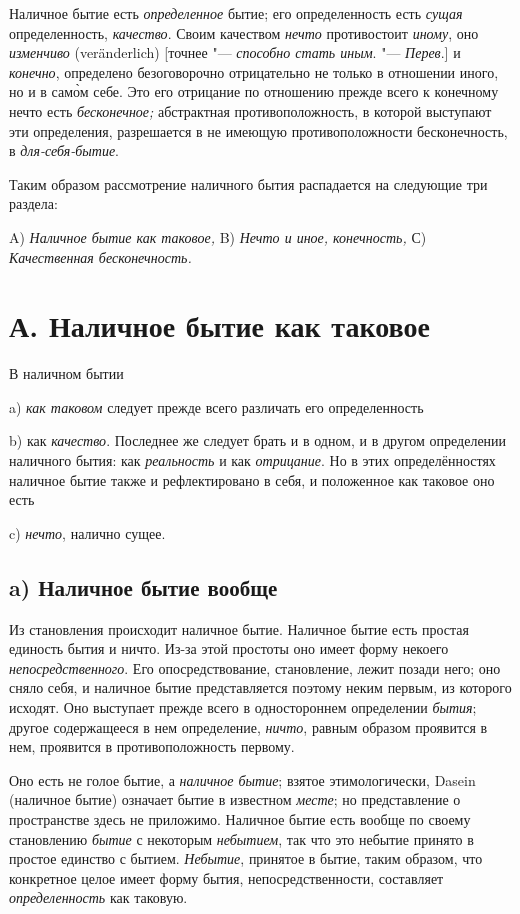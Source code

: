 Наличное бытие есть {\em определенное} бытие; его
определенность есть {\em сущая} определенность,
{\em качество}. Своим качеством
{\em нечто} противостоит
{\em иному}, оно {\em изменчиво}
(veränderlich) [точнее "--- {\em способно стать иным}. "---
{\em Перев}.] и {\em конечно},
определено безоговорочно отрицательно не только в отношении
иного, но и в сам\`{о}м себе. Это его отрицание по отношению прежде всего к
конечному нечто есть {\em бесконечное;} абстрактная
противоположность, в которой выступают эти определения, разрешается в не
имеющую противоположности бесконечность, в
{\em для-себя-бытие}.

Таким образом рассмотрение наличного бытия распадается на следующие три
раздела:

A) {\em Наличное бытие как таковое,}
B) {\em Нечто и иное, конечность,}
С) {\em Качественная бесконечность.}

\section[А. Наличное бытие как таковое]{А. Наличное бытие как таковое}
В наличном бытии

a) {\em как таковом} следует прежде всего различать его
определенность

b) как {\em качество}. Последнее же следует брать и в
одном, и в другом определении наличного бытия: как
{\em реальность} и как
{\em отрицание}. Но в этих определённостях наличное
бытие также и рефлектировано в себя, и положенное как таковое оно есть

c) {\em нечто}, налично сущее.

\subsection[a) Наличное бытие вообще]{a) Наличное бытие вообще}
Из становления происходит наличное бытие. Наличное бытие есть простая
единость бытия и ничто. Из-за этой простоты оно имеет форму некоего
{\em непосредственного}. Его опосредствование,
становление, лежит позади него; оно сняло себя, и наличное бытие
представляется поэтому неким первым, из которого исходят. Оно выступает
прежде всего в одностороннем определении {\em бытия};
другое содержащееся в нем определение, {\em ничто},
равным образом проявится в нем, проявится в противоположность первому.

Оно есть не голое бытие, а {\em наличное бытие}; взятое
этимологически, Dasein (наличное бытие) означает бытие в известном
{\em месте}; но представление о пространстве здесь не
приложимо. Наличное бытие есть вообще по своему становлению
{\em бытие} с некоторым
{\em небытием}, так что это небытие принято в простое
единство с бытием. {\em Небытие}, принятое в бытие,
таким образом, что конкретное целое имеет форму бытия, непосредственности,
составляет {\em определенность} как таковую.

